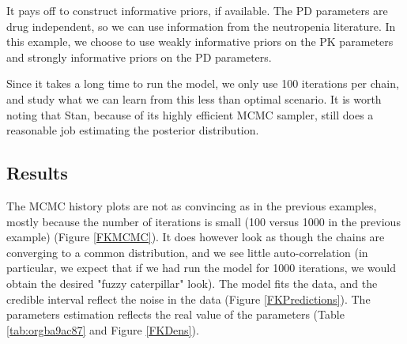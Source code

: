 \documentclass[11pt, reqno, oneside]{amsbook}
\numberwithin{equation}{chapter}
\numberwithin{figure}{chapter}
\numberwithin{table}{chapter}
\theoremstyle{remark}
\begin{document}
It pays off to construct informative priors, if available.
The PD parameters are drug independent,
so we can use information from the neutropenia literature. In this
example, we choose to use weakly informative priors on the PK
parameters and strongly informative priors on the PD parameters. 

Since it takes a long time to run the model, we only use 100
iterations per chain, and study what we can learn from this less than
optimal scenario. It is worth noting that Stan, because of its highly
efficient MCMC sampler, still does a reasonable job estimating the
posterior distribution.

\subsection{Results}
\label{sec:org1900ccc}
The MCMC history plots are not as convincing
as in the previous examples, mostly because the number of iterations
is small (100 versus 1000 in the previous example) (Figure \ref{FKMCMC}). It does however look as though the chains are converging
to a common distribution, and we see little auto-correlation (in
particular, we expect that if we had run the model for 1000
iterations, we would obtain the desired "fuzzy caterpillar"
look). The model fits the data, and the credible interval reflect the
noise in the data (Figure \ref{FKPredictions}). The parameters
estimation reflects the real value of the parameters (Table \ref{tab:orgba9ac87} and Figure \ref{FKDens}).
\end{document}
